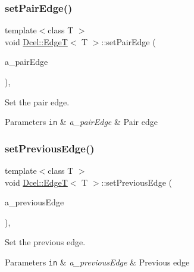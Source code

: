 \subsubsection{\texorpdfstring{set\+Pair\+Edge()}{setPairEdge()}}
{\footnotesize\ttfamily template$<$class T $>$ \\
void \hyperlink{classDcel_1_1EdgeT}{Dcel\+::\+EdgeT}$<$ T $>$\+::set\+Pair\+Edge (\begin{DoxyParamCaption}\item[{const \hyperlink{classDcel_1_1EdgeT_af525f4228d820f6b8b23fc02d937e4c8}{Edge\+Ptr} \&}]{a\+\_\+pair\+Edge }\end{DoxyParamCaption})\hspace{0.3cm}{\ttfamily [inline]}, {\ttfamily [noexcept]}}



Set the pair edge. 


\begin{DoxyParams}[1]{Parameters}
\mbox{\tt in}  & {\em a\+\_\+pair\+Edge} & Pair edge \\
\hline
\end{DoxyParams}
\mbox{\label{classDcel_1_1EdgeT_af5aa7f27fe95ba4331259b4de927bb37}} 
\subsubsection{\texorpdfstring{set\+Previous\+Edge()}{setPreviousEdge()}}
{\footnotesize\ttfamily template$<$class T $>$ \\
void \hyperlink{classDcel_1_1EdgeT}{Dcel\+::\+EdgeT}$<$ T $>$\+::set\+Previous\+Edge (\begin{DoxyParamCaption}\item[{const \hyperlink{classDcel_1_1EdgeT_af525f4228d820f6b8b23fc02d937e4c8}{Edge\+Ptr} \&}]{a\+\_\+previous\+Edge }\end{DoxyParamCaption})\hspace{0.3cm}{\ttfamily [inline]}, {\ttfamily [noexcept]}}



Set the previous edge. 


\begin{DoxyParams}[1]{Parameters}
\mbox{\tt in}  & {\em a\+\_\+previous\+Edge} & Previous edge \\
\hline
\end{DoxyParams}
\mbox{\label{classDcel_1_1EdgeT_a2611a8e0ae581ab8822f677d6d69edbd}} 
